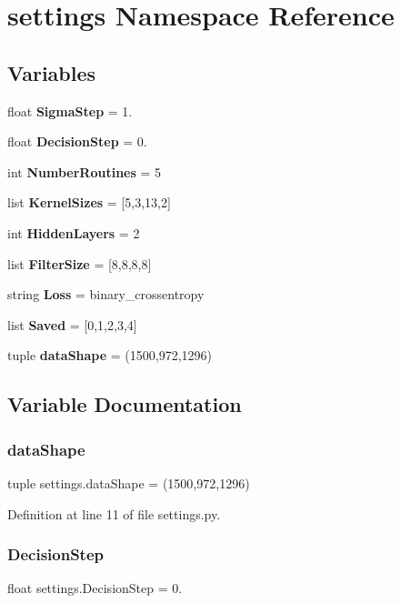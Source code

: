 \section{settings Namespace Reference}
\label{namespacesettings}
\subsection*{Variables}
\begin{DoxyCompactItemize}
\item 
float \textbf{ Sigma\+Step} = 1.
\item 
float \textbf{ Decision\+Step} = 0.
\item 
int \textbf{ Number\+Routines} = 5
\item 
list \textbf{ Kernel\+Sizes} = [5,3,13,2]
\item 
int \textbf{ Hidden\+Layers} = 2
\item 
list \textbf{ Filter\+Size} = [8,8,8,8]
\item 
string \textbf{ Loss} = \textquotesingle{}binary\+\_\+crossentropy\textquotesingle{}
\item 
list \textbf{ Saved} = [0,1,2,3,4]
\item 
tuple \textbf{ data\+Shape} = (1500,972,1296)
\end{DoxyCompactItemize}


\subsection{Variable Documentation}
\mbox{\label{namespacesettings_a80442e02fa60d15571bdc81b9034a523}} 
\subsubsection{data\+Shape}
{\footnotesize\ttfamily tuple settings.\+data\+Shape = (1500,972,1296)}



Definition at line 11 of file settings.\+py.

\mbox{\label{namespacesettings_aef7b8eeb64ea45df8a7fab8d03fa6508}} 
\subsubsection{Decision\+Step}
{\footnotesize\ttfamily float settings.\+Decision\+Step = 0.}



